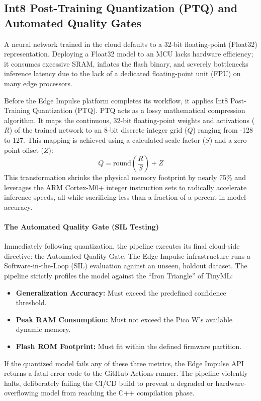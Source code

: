 \documentclass[11pt,a4paper,openany]{book}
\begin{document}
\subsection{Int8 Post-Training Quantization (PTQ) and Automated Quality Gates}
A neural network trained in the cloud defaults to a 32-bit floating-point (Float32) representation. Deploying a Float32 model to an MCU lacks hardware efficiency; it consumes excessive SRAM, inflates the flash binary, and severely bottlenecks inference latency due to the lack of a dedicated floating-point unit (FPU) on many edge processors.

Before the Edge Impulse platform completes its workflow, it applies Int8 Post-Training Quantization (PTQ). PTQ acts as a lossy mathematical compression algorithm. It maps the continuous, 32-bit floating-point weights and activations ($R$) of the trained network to an 8-bit discrete integer grid ($Q$) ranging from -128 to 127. This mapping is achieved using a calculated scale factor ($S$) and a zero-point offset ($Z$):
\begin{equation}
Q = \text{round}\left(\frac{R}{S}\right) + Z
\end{equation}
This transformation shrinks the physical memory footprint by nearly 75\% and leverages the ARM Cortex-M0+ integer instruction sets to radically accelerate inference speeds, all while sacrificing less than a fraction of a percent in model accuracy.

\paragraph{The Automated Quality Gate (SIL Testing)}
Immediately following quantization, the pipeline executes its final cloud-side directive: the Automated Quality Gate. The Edge Impulse infrastructure runs a Software-in-the-Loop (SIL) evaluation against an unseen, holdout dataset. The pipeline strictly profiles the model against the ``Iron Triangle'' of TinyML:
\begin{itemize}
    \item \textbf{Generalization Accuracy:} Must exceed the predefined confidence threshold.
    \item \textbf{Peak RAM Consumption:} Must not exceed the Pico W's available dynamic memory.
    \item \textbf{Flash ROM Footprint:} Must fit within the defined firmware partition.
\end{itemize}

If the quantized model fails any of these three metrics, the Edge Impulse API returns a fatal error code to the GitHub Actions runner. The pipeline violently halts, deliberately failing the CI/CD build to prevent a degraded or hardware-overflowing model from reaching the C++ compilation phase.
\end{document}
